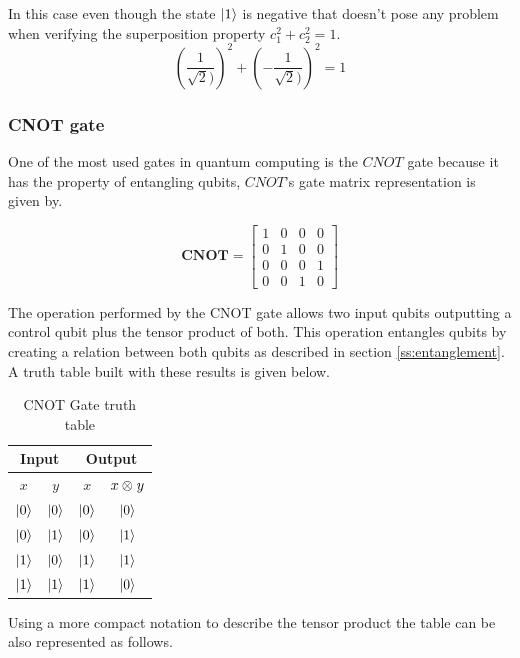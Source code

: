 \documentclass[12pt,a4paper]{scrartcl}
\newcommand{\tens}[1]{%
  \mathbin{\mathop{\otimes}\displaylimits_{#1}}%
}
\begin{document}
In this case even though the state $\ket{1}$ is negative that doesn't pose any problem when verifying the superposition property $c_1^2+c_2^2=1$.
\[(\frac{1}{\sqrt{2})})^2 + (-\frac{1}{\sqrt{2})})^2 = 1\]



\subsubsection{CNOT gate}

One of the most used gates in quantum computing is the $CNOT$ gate because it has the property of entangling qubits, $CNOT$'s gate matrix representation is given by.

\begin{equation}
 \boldsymbol{CNOT} = 
 \begin{bmatrix}
 1 &  0 & 0 & 0 \\ 
 0 &  1 & 0 & 0 \\
 0 &  0 & 0 & 1 \\
 0 &  0 & 1 & 0 
 \end{bmatrix}
\label{gate:cnot}   
\end{equation}

The operation performed by the CNOT gate allows two input qubits outputting a control qubit plus the tensor product of both.  This operation entangles qubits by creating a relation between both qubits as described in section \ref{ss:entanglement}. A truth table built with these results is given below.

\begin{table}[H]
\centering
\begin{tabular}{|c|c|c|c|} 
 \hline
\multicolumn{2}{|c|}{Input} & \multicolumn{2}{|c|}{Output} \\
\hline
$x$ & $y$ & $x$ & $x\tens{}y$ \\
\hline
$\ket{0}$ & $\ket{0}$ & $\ket{0}$ & $\ket{0}$ \\
\hline
$\ket{0}$ & $\ket{1}$ & $\ket{0}$ & $\ket{1}$ \\
\hline
$\ket{1}$ & $\ket{0}$ & $\ket{1}$ & $\ket{1}$ \\
\hline
$\ket{1}$ & $\ket{1}$ & $\ket{1}$ & $\ket{0}$ \\
\hline
\end{tabular}
\caption{CNOT Gate truth table \cite{bernhardt2019quantum}}
\label{table:cnot}
\end{table}

Using a more compact notation to describe the tensor product the table can be also represented as follows.
\end{document}
